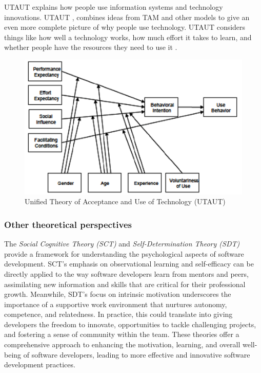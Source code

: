 \documentclass[journal,onecolumn]{IEEEtran}
\begin{document}
UTAUT explains how people use information systems and technology innovations. UTAUT \cite{venkatesh_user_2003}, combines ideas from TAM and other models to give an even more complete picture of why people use technology. UTAUT considers things like how well a technology works, how much effort it takes to learn, and whether people have the resources they need to use it \cite{ayaz_analysis_2020}.
\begin{figure}[t]
    \centering
    \includegraphics[width=0.8\linewidth]{img/Picture3.png}
    \caption{Unified Theory of Acceptance and Use of Technology (UTAUT) }
    \label{fig:utaut}
\end{figure}

\subsubsection{Other theoretical perspectives}
\vspace{12pt}
The \textit{Social Cognitive Theory (SCT)} \cite{10.1371/journal.pone.0134977}and \textit{Self-Determination Theory (SDT)} \cite{Law2020} provide a framework for understanding the psychological aspects of software development. SCT's emphasis on observational learning and self-efficacy can be directly applied to the way software developers learn from mentors and peers, assimilating new information and skills that are critical for their professional growth. Meanwhile, SDT's focus on intrinsic motivation underscores the importance of a supportive work environment that nurtures autonomy, competence, and relatedness. In practice, this could translate into giving developers the freedom to innovate, opportunities to tackle challenging projects, and fostering a sense of community within the team. These theories offer a comprehensive approach to enhancing the motivation, learning, and overall well-being of software developers, leading to more effective and innovative software development practices.
\end{document}
